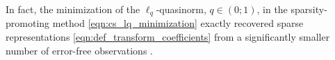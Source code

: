 In fact,
the minimization of
the $\ell_{q}$-quasinorm, $q \in ( 0; 1 )$, in
the sparsity-promoting method
\eqref{eqn:cs_lq_minimization} exactly recovered
sparse representations
\eqref{eqn:def_transform_coefficients} from
a significantly smaller number of
error-free observations
\cite{proc:ChartrandICASSP2008,article:ChartrandISPL2007}.
